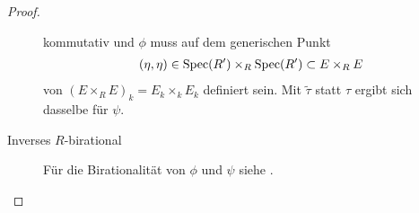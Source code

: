 \begin{Lemma}
\begin{proof}
\begin{description}
\begin{center}
      \end{center}
      kommutativ und $\phi$ muss auf dem generischen Punkt
      \begin{gather*}
        (\eta,\eta)\in\operatorname{Spec}(R')\times_R\operatorname{Spec}(R')\subset E\times_R E  
      \end{gather*}
      von $(E\times_R E)_k=E_k\times_k E_k$ definiert sein.
      Mit $\tilde\tau$ statt $\tau$ ergibt sich dasselbe für $\psi$.
      
    \item[Inverses $R$-birational]
      Für die Birationalität von $\phi$ und $\psi$ siehe
      \cite[Propsition~IV.6.10]{silverman2}.
      \qedhere
    \end{description}
  \end{proof}
\end{Lemma}

